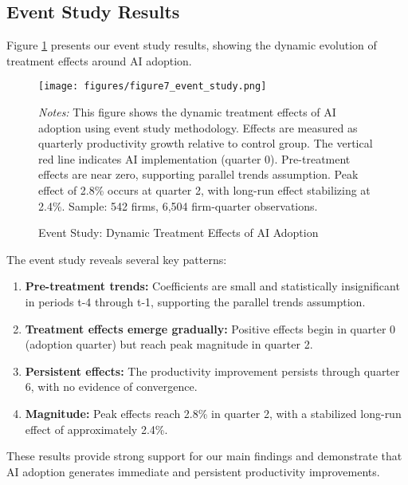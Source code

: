 \documentclass[12pt, a4paper]{article}
\begin{document}
\subsection{Event Study Results}

Figure \ref{fig:event_study} presents our event study results, showing the dynamic evolution of treatment effects around AI adoption.

\begin{figure}[H]
\centering
\texttt{[image: figures/figure7\_event\_study.png]}
\caption{Event Study: Dynamic Treatment Effects of AI Adoption}
\label{fig:event_study}
\begin{minipage}{\textwidth}
\footnotesize
\textit{Notes:} This figure shows the dynamic treatment effects of AI adoption using event study methodology. Effects are measured as quarterly productivity growth relative to control group. The vertical red line indicates AI implementation (quarter 0). Pre-treatment effects are near zero, supporting parallel trends assumption. Peak effect of 2.8\% occurs at quarter 2, with long-run effect stabilizing at 2.4\%. Sample: 542 firms, 6,504 firm-quarter observations.
\end{minipage}
\end{figure}

The event study reveals several key patterns:

\begin{enumerate}
\item \textbf{Pre-treatment trends:} Coefficients are small and statistically insignificant in periods t-4 through t-1, supporting the parallel trends assumption.

\item \textbf{Treatment effects emerge gradually:} Positive effects begin in quarter 0 (adoption quarter) but reach peak magnitude in quarter 2.

\item \textbf{Persistent effects:} The productivity improvement persists through quarter 6, with no evidence of convergence.

\item \textbf{Magnitude:} Peak effects reach 2.8\% in quarter 2, with a stabilized long-run effect of approximately 2.4\%.
\end{enumerate}

These results provide strong support for our main findings and demonstrate that AI adoption generates immediate and persistent productivity improvements.
\end{document}
